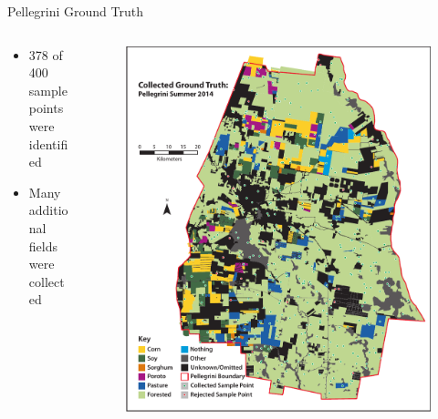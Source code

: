 \documentclass[draft,compress]{beamer}
\begin{document}
\begin{frame}{Pellegrini Ground Truth}
\begin{columns}[onlytextwidth]
\begin{column}{0.47\textwidth}
  \begin{itemize}
    \item 378 of 400 sample\\points were identified
    \item Many additional\\fields were collected
  \end{itemize}
\end{column}
\begin{column}{0.53\textwidth}
  \begin{figure}
    \includegraphics[width=1.0\textwidth]{Graphics/collecteddata.pdf}
  \end{figure}
\end{column}
\end{columns}
\end{frame}
\end{document}
